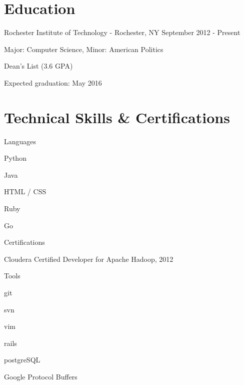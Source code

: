 \documentclass[a4paper,margin,line]{resume}
\newcommand{\rdate}[1]{\hfill {\small #1}}
\begin{document}
\begin{resume}
\section{\mysidestyle Education}
	\begin{compactdesc}
		\item[Rochester Institute of Technology] - Rochester, NY \rdate{September 2012 - Present}
		\begin{compactitem} { \small
			\item Major: Computer Science, Minor: American Politics
            \item Dean's List (3.6 GPA)
			\item Expected graduation: May 2016
		} \end{compactitem}
	\end{compactdesc}

\section{\mysidestyle Technical Skills \& Certifications}
	\begin{compactdesc}
		\item[Languages] \begin{inparaenum} { \small
			\item Python
			\item Java
			\item HTML / CSS
			\item Ruby
			\item Go
		} \end{inparaenum}
        \item[Certifications] \begin{inparaenum} { \small
            \item Cloudera Certified Developer for Apache Hadoop, 2012    
        } \end{inparaenum}
		\item[Tools] \begin{inparaenum} { \small
			\item git
            \item svn
            \item vim
            \item rails
            \item postgreSQL
            \item Google Protocol Buffers
		} \end{inparaenum}
	\end{compactdesc}


\end{resume}
\end{document}
